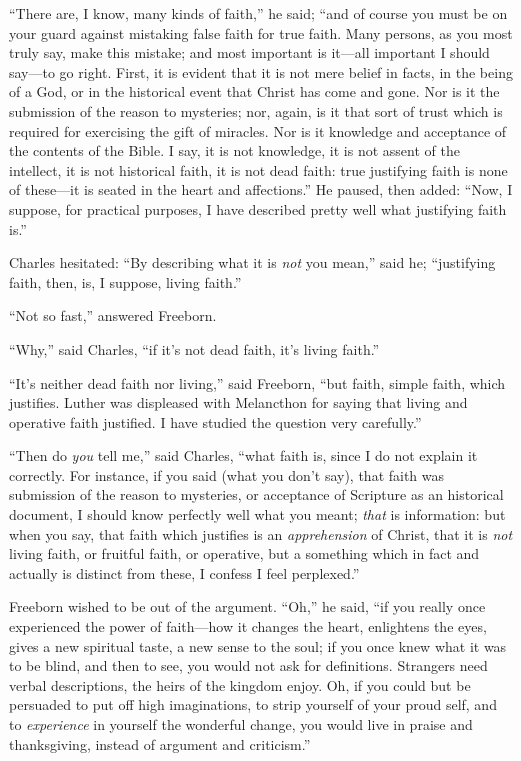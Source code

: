 ``There are, I know, many kinds of faith,'' he said;
``and of course you must be on your guard against mistaking false
faith for true faith. Many persons, as you most truly say, make this
mistake; and most important is it—all important I should say—to go
right. First, it is evident that it is not mere belief in facts, in
the being of a God, or in the historical event that Christ has come
and gone. Nor is it the submission of the reason to mysteries; nor,
again, is it that sort of trust which is required for exercising the
gift of miracles. Nor is it knowledge and acceptance of the contents
of the Bible. I say, it is not knowledge, it is not assent of the
intellect, it is not historical faith, it is not dead faith: true
justifying faith is none of these—it is seated in the heart and
affections.'' He paused, then added: ``Now, I suppose, for
practical purposes, I have described pretty well what justifying faith
is.''

Charles hesitated: ``By describing what it is \emph{not} you
mean,'' said he; ``justifying faith, then, is, I suppose,
living faith.''

``Not so fast,'' answered Freeborn.

``Why,'' said Charles, ``if it's not dead faith, it's
living faith.''

``It's neither dead faith nor living,'' said Freeborn,
``but faith, simple faith, which justifies. Luther was displeased
with Melancthon for saying that living and operative faith justified.
I have studied the question very carefully.''

``Then do \emph{you} tell me,'' said Charles, ``what
faith is, since I do not explain it correctly. For instance, if you
said (what you don't say), that faith was submission of the reason to
mysteries, or acceptance of Scripture as an historical document, I
should know perfectly well what you meant; \emph{that} is information:
but when you say, that faith which justifies is an \emph{apprehension}
of Christ, that it is \emph{not} living faith, or fruitful faith, or
operative, but a something which in fact and actually is distinct from
these, I confess I feel perplexed.''

Freeborn wished to be out of the argument. ``Oh,'' he said,
``if you really once experienced the power of faith—how it
changes the heart, enlightens the eyes, gives a new spiritual taste, a
new sense to the soul; if you once knew what it was to be blind, and
then to see, you would not ask for definitions. Strangers need verbal
descriptions, the heirs of the kingdom enjoy. Oh, if you could but be
persuaded to put off high imaginations, to strip yourself of your
proud self, and to \emph{experience} in yourself the wonderful change,
you would live in praise and thanksgiving, instead of argument and
criticism.''

